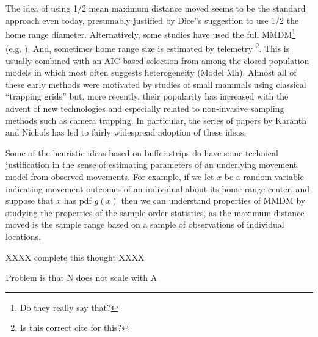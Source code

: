 The idea of using 1/2 mean maximum distance moved
\citep{wilson_anderson:1985a} seems to be the standard approach even
today, presumably justified by Dice''s suggestion to use 1/2 the home
range diameter. Alternatively, some studies have used the full
MMDM\footnote{Do they really say that?}
(e.g. \citet{parmenter_etal:2003}). And, sometimes home range size is
estimated by telemetry \citep{karanth:1995}\footnote{Is this correct
  cite for this?}. This is usually combined
with an AIC-based selection from among the closed-population models in
\citet{otis_etal:1978} which most often suggests heterogeneity (Model
Mh).  Almost all of these early methods were motivated by studies of
small mammals using classical ``trapping grids'' but, more recently,
their popularity has increased with the advent of new technologies and
especially related to non-invasive sampling methods such as camera
trapping. In particular, the series of papers by Karanth and Nichols
\citep{karanth:1995, karanth_nichols:1998, karanth_nichols:2002} 
has led to fairly widespread adoption of these ideas.



Some of the heuristic ideas based on buffer strips do have some
technical justification in the sense of estimating parameters of an
underlying movement model from observed movements. For example, if we
let $x$ be a random variable indicating movement outcomes of an
individual about its  home range center, and suppose that $x$ has pdf
$g(x)$ then we can understand properties of MMDM by studying the
properties of the sample order statistics, as the maximum distance
moved is the sample range based on a sample of observations of
individual locations. 

XXXX complete this thought XXXX

Problem is that N does not scale with A




